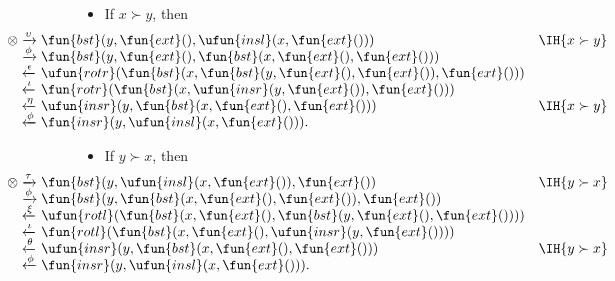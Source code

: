 \begin{itemize}

  \item If \(x \succ y\), then
\begin{equation*}
      \hspace*{-25mm}
\begin{array}{@{}r@{\;}l@{\;}l@{\quad}r@{}}
\otimes
& \xrightarrow{\smash{\upsilon}} &
  \fun{bst}(y,\fun{ext}(),\ufun{insl}(x,\fun{ext}()))
& \IH{x \succ y}\\
& \xrightarrow{\smash{\phi}} &
  \fun{bst}(y,\fun{ext}(),\fun{bst}(x,\fun{ext}(),\fun{ext}()))\\
& \xleftarrow{\smash{\epsilon}} &
  \ufun{rotr}(\fun{bst}(x,\fun{bst}(y,\fun{ext}(),\fun{ext}()),\fun{ext}()))\\
& \xleftarrow{\smash{\iota}} &
  \fun{rotr}(\fun{bst}(x,\ufun{insr}(y,\fun{ext}()),\fun{ext}()))\\
& \xleftarrow{\smash{\eta}} &
  \ufun{insr}(y,\fun{bst}(x,\fun{ext}(),\fun{ext}()))
& \IH{x \succ y}\\
& \xleftarrow{\smash{\phi}} &
  \fun{insr}(y,\ufun{insl}(x,\fun{ext}())).
\end{array}
\end{equation*}

  \item If \(y \succ x\), then
    \begin{equation*}
      \hspace*{-25mm}
\begin{array}{@{}r@{\;}l@{\;}l@{\quad}r@{}}
\otimes & \xrightarrow{\smash{\tau}} &
  \fun{bst}(y,\ufun{insl}(x,\fun{ext}()),\fun{ext}())
& \IH{y \succ x}\\
& \xrightarrow{\smash{\phi}} &
  \fun{bst}(y,\fun{bst}(x,\fun{ext}(),\fun{ext}()),\fun{ext}())\\
& \xleftarrow{\smash{\xi}} &
  \ufun{rotl}(\fun{bst}(x,\fun{ext}(),\fun{bst}(y,\fun{ext}(),\fun{ext}())))\\
& \xleftarrow{\smash{\iota}} &
  \fun{rotl}(\fun{bst}(x,\fun{ext}(),\ufun{insr}(y,\fun{ext}())))\\
& \xleftarrow{\smash{\theta}} &
  \ufun{insr}(y,\fun{bst}(x,\fun{ext}(),\fun{ext}()))
& \IH{y \succ x}\\
& \xleftarrow{\smash{\phi}} &
  \fun{insr}(y,\ufun{insl}(x,\fun{ext}())).
\end{array}
\end{equation*}
\end{itemize}

